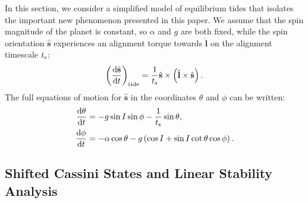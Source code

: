 \documentclass[
        fleqn,
        usenatbib,
    ]{mnras}
\newcommand*{\rd}[2]{\frac{\mathrm{d}#1}{\mathrm{d}#2}}
\newcommand*{\p}[1]{\left(#1\right)}
\newcommand*{\uv}[1]{\hat{\mathbf{#1}}}
\begin{document}
In this section, we consider a simplified model of equilibrium tides that
isolates the important new phenomenon presented in this paper. We assume that
the spin magnitude of the planet is constant, so $\alpha$ and $g$ are both
fixed, while the spin orientation $\uv{s}$ experiences an alignment torque
towards $\uv{l}$ on the alignment timescale $t_{\rm s}$:
\begin{equation}
    \p{\rd{\uv{s}}{t}}_{\rm tide}
        = \frac{1}{t_{\rm s}} \uv{s} \times \p{\uv{l} \times \uv{s}}.
        \label{eq:dsdt_tide_toy}
\end{equation}
The full equations of motion for $\uv{s}$ in the coordinates $\theta$ and $\phi$
can be written:
\begin{align}
    \rd{\theta}{t} &= -g\sin I \sin \phi - \frac{1}{t_{\rm s}} \sin \theta,
        \label{eq:dqdt_toy}\\
    \rd{\phi}{t} &= -\alpha \cos\theta
        - g\p{\cos I + \sin I \cot \theta \cos \phi}.\label{eq:dfdt_toy}
\end{align}

\subsection{Shifted Cassini States and Linear Stability
Analysis}\label{ss:tidal_equils}
\end{document}

